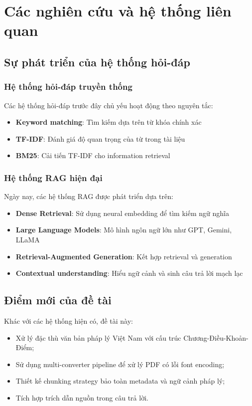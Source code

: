 \documentclass[../DoAn.tex]{subfiles}
\begin{document}
\section{Các nghiên cứu và hệ thống liên quan}

\subsection{Sự phát triển của hệ thống hỏi-đáp}

\subsubsection{Hệ thống hỏi-đáp truyền thống}
Các hệ thống hỏi-đáp trước đây chủ yếu hoạt động theo nguyên tắc:
\begin{itemize}
    \item \textbf{Keyword matching}: Tìm kiếm dựa trên từ khóa chính xác
    \item \textbf{TF-IDF}: Đánh giá độ quan trọng của từ trong tài liệu
    \item \textbf{BM25}: Cải tiến TF-IDF cho information retrieval
\end{itemize}

\subsubsection{Hệ thống RAG hiện đại}
Ngày nay, các hệ thống RAG được phát triển dựa trên:
\begin{itemize}
    \item \textbf{Dense Retrieval}: Sử dụng neural embedding để tìm kiếm ngữ nghĩa
    \item \textbf{Large Language Models}: Mô hình ngôn ngữ lớn như GPT, Gemini, LLaMA
    \item \textbf{Retrieval-Augmented Generation}: Kết hợp retrieval và generation
    \item \textbf{Contextual understanding}: Hiểu ngữ cảnh và sinh câu trả lời mạch lạc
\end{itemize}

\subsection{Điểm mới của đề tài}
Khác với các hệ thống hiện có, đề tài này:
\begin{itemize}
    \item Xử lý đặc thù văn bản pháp lý Việt Nam với cấu trúc Chương-Điều-Khoản-Điểm;
    \item Sử dụng multi-converter pipeline để xử lý PDF có lỗi font encoding;
    \item Thiết kế chunking strategy bảo toàn metadata và ngữ cảnh pháp lý;
    \item Tích hợp trích dẫn nguồn trong câu trả lời.
\end{itemize}
\end{document}
